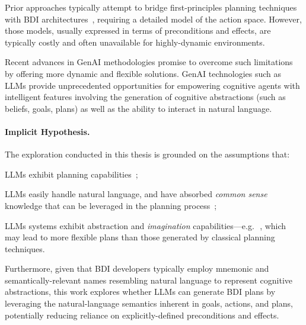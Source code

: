 \documentclass[12pt,a4paper,openright,twoside]{book}
\begin{document}
Prior approaches typically attempt to bridge first-principles planning techniques with \ac{BDI} architectures~\cite{SilvaSP09}, requiring a detailed model of the action space.
%
However, those models, usually expressed in terms of preconditions and effects, are typically costly and often unavailable for highly-dynamic environments.

Recent advances in \ac{GenAI} methodologies promise to overcome such limitations by offering more dynamic and flexible solutions.
%
\ac{GenAI} technologies such as \acp{LLM} provide unprecedented opportunities for empowering cognitive agents with intelligent features involving the generation of cognitive abstractions (such as beliefs, goals, plans) as well as the ability to interact in natural language.

\paragraph{Implicit Hypothesis.} The exploration conducted in this thesis is grounded on the assumptions that:
%
\begin{inlinelist}
    \item \acp{LLM} exhibit planning capabilities~\cite{HuangLWCWL24};
    \item \acp{LLM} easily handle natural language, and have absorbed \emph{common sense} knowledge that can be leveraged in the planning process~\cite{llmoracles-kbs310};
    \item \acp{LLM} systems exhibit abstraction and \emph{imagination} capabilities---e.g.\,~\cite{AregbedeAPLL24}, which may lead to more flexible plans than those generated by classical planning techniques.
\end{inlinelist}
%
Furthermore, given that \ac{BDI} developers typically employ mnemonic and semantically-relevant names resembling natural language to represent cognitive abstractions, this work explores whether \acp{LLM} can generate \ac{BDI} plans by leveraging the natural-language semantics inherent in goals, actions, and plans, potentially reducing reliance on explicitly-defined preconditions and effects.
\end{document}
